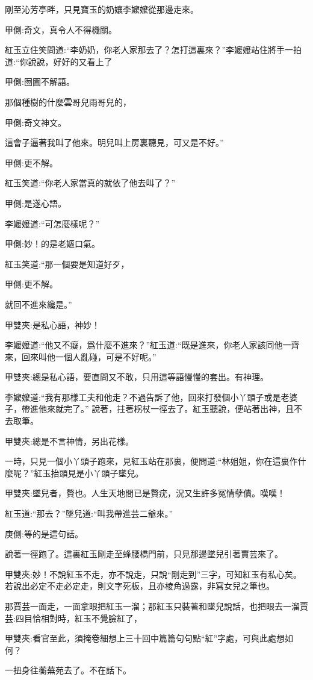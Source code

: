 \begin{parag}
    剛至沁芳亭畔，只見寶玉的奶孃李嬤嬤從那邊走來。\begin{note}甲側:奇文，真令人不得機關。\end{note}紅玉立住笑問道:“李奶奶，你老人家那去了？怎打這裏來？”李嬤嬤站住將手一拍道:“你說說，好好的又看上了\begin{note}甲側:囫圇不解語。\end{note}那個種樹的什麼雲哥兒雨哥兒的，\begin{note}甲側:奇文神文。\end{note}這會子逼著我叫了他來。明兒叫上房裏聽見，可又是不好。”\begin{note}甲側:更不解。\end{note}紅玉笑道:“你老人家當真的就依了他去叫了？”\begin{note}甲側:是遂心語。\end{note}李嬤嬤道:“可怎麼樣呢？”\begin{note}甲側:妙！的是老嫗口氣。\end{note}紅玉笑道:“那一個要是知道好歹，\begin{note}甲側:更不解。\end{note}就回不進來纔是。”\begin{note}甲雙夾:是私心語，神妙！\end{note}李嬤嬤道:“他又不癡，爲什麼不進來？”紅玉道:“既是進來，你老人家該同他一齊來，回來叫他一個人亂碰，可是不好呢。”\begin{note}甲雙夾:總是私心語，要直問又不敢，只用這等語慢慢的套出。有神理。\end{note}李嬤嬤道:“我有那樣工夫和他走？不過告訴了他，回來打發個小丫頭子或是老婆子，帶進他來就完了。” 說著，拄著柺杖一徑去了。紅玉聽說，便站著出神，且不去取筆。\begin{note}甲雙夾:總是不言神情，另出花樣。\end{note}
\end{parag}


\begin{parag}
    一時，只見一個小丫頭子跑來，見紅玉站在那裏，便問道:“林姐姐，你在這裏作什麼呢？”紅玉抬頭見是小丫頭子墜兒。\begin{note}甲雙夾:墜兒者，贅也。人生天地間已是贅疣，況又生許多冤情孽債。嘆嘆！\end{note}紅玉道:“那去？”墜兒道:“叫我帶進芸二爺來。”\begin{note}庚側:等的是這句話。\end{note}說著一徑跑了。這裏紅玉剛走至蜂腰橋門前，只見那邊墜兒引著賈芸來了。\begin{note}甲雙夾:妙！不說紅玉不走，亦不說走，只說“剛走到”三字，可知紅玉有私心矣。若說出必定不走必定走，則文字死板，且亦棱角過露，非寫女兒之筆也。\end{note}那賈芸一面走，一面拿眼把紅玉一溜；那紅玉只裝著和墜兒說話，也把眼去一溜賈芸:四目恰相對時，紅玉不覺臉紅了，\begin{note}甲雙夾:看官至此，須掩卷細想上三十回中篇篇句句點“紅”字處，可與此處想如何？\end{note}一扭身往蘅蕪苑去了。不在話下。
\end{parag}


